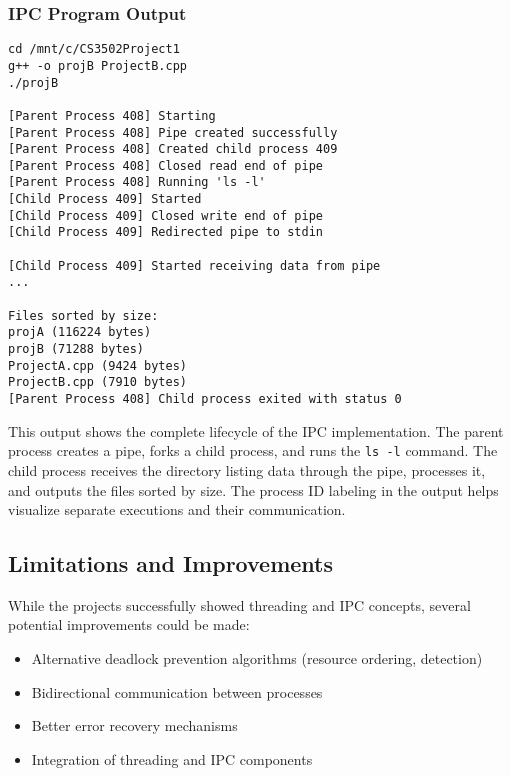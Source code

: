 \documentclass[12pt]{article}
\begin{document}
\subsubsection{IPC Program Output}

\begin{lstlisting}[style=consolestyle, caption=Running the IPC Program in Ubuntu Terminal]
cd /mnt/c/CS3502Project1
g++ -o projB ProjectB.cpp
./projB

[Parent Process 408] Starting
[Parent Process 408] Pipe created successfully
[Parent Process 408] Created child process 409
[Parent Process 408] Closed read end of pipe
[Parent Process 408] Running 'ls -l'
[Child Process 409] Started
[Child Process 409] Closed write end of pipe
[Child Process 409] Redirected pipe to stdin

[Child Process 409] Started receiving data from pipe
...

Files sorted by size:
projA (116224 bytes)
projB (71288 bytes)
ProjectA.cpp (9424 bytes)
ProjectB.cpp (7910 bytes)
[Parent Process 408] Child process exited with status 0
\end{lstlisting}

This output shows the complete lifecycle of the IPC implementation. The parent process creates a pipe, forks a child process, and runs the \texttt{ls -l} command. The child process receives the directory listing data through the pipe, processes it, and outputs the files sorted by size. The process ID labeling in the output helps visualize separate executions and their communication.


\subsection{Limitations and Improvements}
While the projects successfully showed threading and IPC concepts, several potential improvements could be made:

\begin{itemize}
    \item Alternative deadlock prevention algorithms (resource ordering, detection)
    \item Bidirectional communication between processes
    \item Better error recovery mechanisms
    \item Integration of threading and IPC components
\end{itemize}
\end{document}
